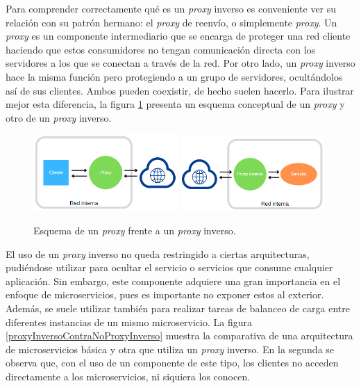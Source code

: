 \documentclass[11pt,spanish,listoffigures]{tfgetsinf}
\begin{document}
Para comprender correctamente qué es un \emph{proxy} inverso es conveniente ver su relación con su patrón hermano: el \emph{proxy} de reenvío, o simplemente \emph{proxy}. Un \emph{proxy} es un componente intermediario que se encarga de proteger una red cliente haciendo que estos consumidores no tengan comunicación directa con los servidores a los que se conectan a través de la red. Por otro lado, un \emph{proxy} inverso hace la misma función pero protegiendo a un grupo de servidores, ocultándolos así de sus clientes. Ambos pueden coexistir, de hecho suelen hacerlo. Para ilustrar mejor esta diferencia, la figura \ref{proxyContraProxyInverso} presenta un esquema conceptual de un \emph{proxy} y otro de un \emph{proxy} inverso.

\begin{figure}[ht]
\centering
\includegraphics[width=0.49\textwidth]{imagenes/proxy}
\includegraphics[width=0.49\textwidth]{imagenes/proxyInverso}
\caption{Esquema de un \emph{proxy} frente a un \emph{proxy} inverso.}
	\label{proxyContraProxyInverso}
\end{figure}

El uso de un \emph{proxy} inverso no queda restringido a ciertas arquitecturas, pudiéndose utilizar para ocultar el servicio o servicios que consume cualquier aplicación. Sin embargo, este componente adquiere una gran importancia en el enfoque de microservicios, pues es importante no exponer estos al exterior. Además, se suele utilizar también para realizar tareas de balanceo de carga entre diferentes instancias de un mismo microservicio. La figura \ref{proxyInversoContraNoProxyInverso} muestra la comparativa de una arquitectura de microservicios básica y otra que utiliza un \emph{proxy} inverso. En la segunda se observa que, con el uso de un componente de este tipo, los clientes no acceden directamente a los microservicios, ni siquiera los conocen.
\end{document}
